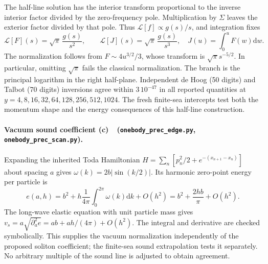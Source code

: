 \documentclass[11pt,a4paper]{article}
\newcommand{\Lc}{\textbf{(c)}\ }
\newcommand{\dd}{\mathrm d}
\newcommand{\scan}{\texttt{onebody\_\allowbreak prec\_\allowbreak scan.py}}
\newcommand{\edge}{\texttt{onebody\_\allowbreak prec\_\allowbreak edge.py}}
\begin{document}
The half-line solution has the interior transform proportional to the
inverse interior factor divided by the zero-frequency pole. Multiplication
by $\Sigma$ leaves the exterior factor divided by that pole. Thus
$\mathcal L[f]\propto g(s)/s$, and integration fixes
\begin{equation}
 \boxed{\mathcal L[F](s)=\sqrt\pi\,\frac{g(s)}{s^2},\qquad
 \mathcal L[J](s)=\sqrt\pi\,\frac{g(s)}{s^3},\quad
 J(u)=\int_0^u F(w)\dd w.} \label{eq:laplace}
\end{equation}
The normalization follows from $F\sim4u^{3/2}/3$, whose transform is
$\sqrt\pi s^{-5/2}$. In particular, omitting $\sqrt\pi$ fails the classical
normalization. The branch is the principal logarithm in the right half-plane.
Independent de Hoog (50 digits) and Talbot (70 digits) inversions agree
within $3\,10^{-47}$ in all reported quantities at
$y=4,8,16,32,64,128,256,512,1024$.
The fresh finite-sea intercepts test both the momentum shape and the energy
consequences of this half-line construction.

\paragraph{Vacuum sound coefficient \Lc\ (\edge, \scan).}
Expanding the inherited Toda Hamiltonian
$H=\sum_n[p_n^2/2+e^{-(x_{n+1}-x_n)}]$ about spacing $a$ gives
$\omega(k)=2b|\sin(k/2)|$. Its harmonic zero-point energy per particle is
\begin{equation}
 e(a,h)=b^2+h\frac1{4\pi}\int_0^{2\pi}\omega(k)\dd k+O(h^2)
       =b^2+\frac{2hb}{\pi}+O(h^2).
\end{equation}
The long-wave elastic equation with unit particle mass gives
$v_s=a\sqrt{\partial_a^2e}=ab+ah/(4\pi)+O(h^2)$.
The integral and derivative are checked symbolically. This supplies the
vacuum normalization independently of the proposed soliton coefficient;
the finite-sea sound extrapolation tests it separately.
No arbitrary multiple of the sound line is adjusted to obtain agreement.
\end{document}

